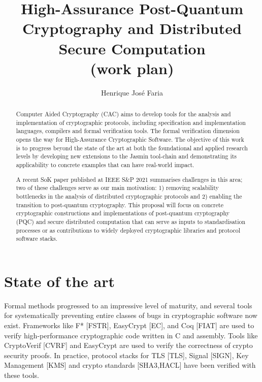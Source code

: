 \documentclass[preprint]{iacrtrans}
\author{}
\institute{}
\title[\texttt{High-Assurance Post-Quantum Cryptography and Distributed Secure Computation}]
{High-Assurance Post-Quantum Cryptography and Distributed Secure Computation \\ (work plan)}
\author{Henrique José Faria}
\begin{document}
\maketitle


\begin{abstract}
  Computer Aided Cryptography (CAC) aims to develop tools for the
  analysis and implementation of cryptographic protocols, including
  specification and implementation languages, compilers and formal
  verification tools. The formal verification dimension opens the way
  for High-Assurance Cryptographic Software. The objective of this
  work is to progress beyond the state of the art at both the
  foundational and applied research levels by developing new
  extensions to the Jasmin tool-chain and demonstrating its
  applicability to concrete examples that can have real-world impact.

  A recent SoK paper \cite{SoK} published at IEEE S\&P 2021
  summarises challenges in this area; two of these challenges serve as
  our main motivation: 1) removing scalability bottlenecks in the
  analysis of distributed cryptographic protocols and 2) enabling the
  transition to post-quantum cryptography. This proposal will focus on
  concrete cryptographic constructions and implementations of
  post-quantum cryptography (PQC) and secure distributed computation
  that can serve as inputs to standardisation processes or as
  contributions to widely deployed cryptographic libraries and
  protocol software stacks.
\end{abstract}

\section*{State of the art}

Formal methods progressed to an impressive level of maturity, and
several tools for systematically preventing entire classes of bugs in
cryptographic software now exist. Frameworks like F* [FSTR], EasyCrypt
[EC], and Coq [FIAT] are used to verify high-performance cryptographic
code written in C and assembly. Tools like CryptoVerif [CVRF] and
EasyCrypt are used to verify the correctness of crypto security
proofs. In practice, protocol stacks for TLS [TLS], Signal [SIGN], Key
Management [KMS] and crypto standards [SHA3,HACL] have been verified
with these tools.
\end{document}

